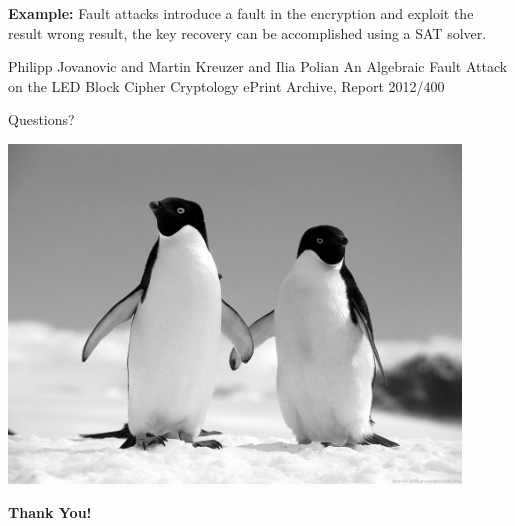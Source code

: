 \documentclass[9pt]{beamer}
\begin{document}
\begin{frame}[allowframebreaks]
\framebreak

\textbf{Example:} Fault attacks introduce a fault in the encryption and exploit the result wrong result, the key recovery can be accomplished using a SAT solver.
\vspace{1em}
\begin{thebibliography}{}
Philipp Jovanovic and Martin Kreuzer and Ilia Polian
\newblock An Algebraic Fault Attack on the LED Block Cipher
\newblock Cryptology ePrint Archive, Report 2012/400
\end{thebibliography}


\end{frame}

\begin{frame}{Questions?}

\begin{center}
 \includegraphics[width=0.9\textwidth]{./kitten-03.jpg}
\end{center} 

\begin{center}\textbf{Thank You!}\end{center}

\end{frame}
\end{document}
